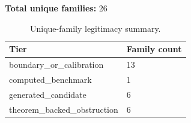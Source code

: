 \noindent\textbf{Total unique families:} 26

\begin{table}[h]
\centering
\caption{Unique-family legitimacy summary.}
\label{tab:family-legitimacy-summary}
\small
\renewcommand{\arraystretch}{1.18}
\begin{tabular}{|p{}|p{}|}
\hline
\centering\textbf{Tier} & \centering\arraybackslash\textbf{Family count} \\
\hline
boundary\_\allowbreak{}or\_\allowbreak{}calibration & 13 \\
computed\_\allowbreak{}benchmark & 1 \\
generated\_\allowbreak{}candidate & 6 \\
theorem\_\allowbreak{}backed\_\allowbreak{}obstruction & 6 \\
\hline
\end{tabular}
\end{table}
